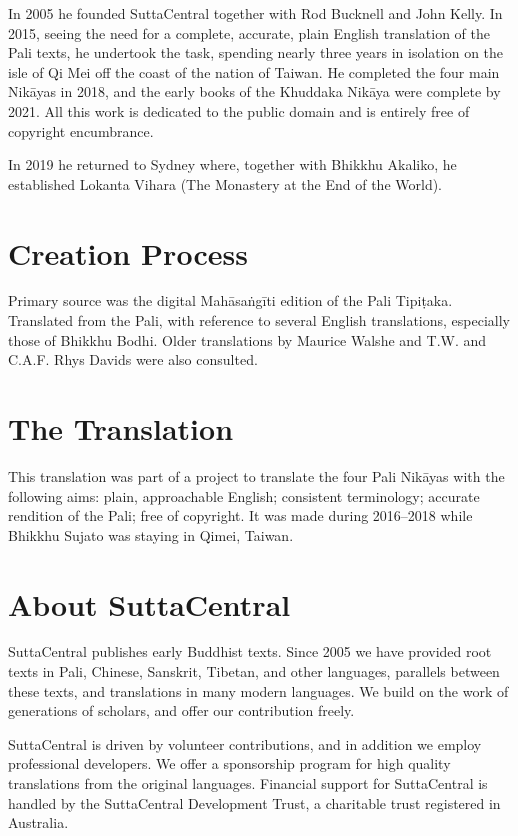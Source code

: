 \documentclass[12pt,openany]{book}%
\begin{document}
In 2005 he founded SuttaCentral together with Rod Bucknell and John Kelly. In 2015, seeing the need for a complete, accurate, plain English translation of the Pali texts, he undertook the task, spending nearly three years in isolation on the isle of Qi Mei off the coast of the nation of Taiwan. He completed the four main \textsanskrit{Nikāyas} in 2018, and the early books of the Khuddaka \textsanskrit{Nikāya} were complete by 2021. All this work is dedicated to the public domain and is entirely free of copyright encumbrance. 

In 2019 he returned to Sydney where, together with Bhikkhu Akaliko, he established Lokanta Vihara (The Monastery at the End of the World). 

\section*{Creation Process}

Primary source was the digital \textsanskrit{Mahāsaṅgīti} edition of the Pali \textsanskrit{Tipiṭaka}. Translated from the Pali, with reference to several English translations, especially those of Bhikkhu Bodhi. Older translations by Maurice Walshe and T.W. and C.A.F. Rhys Davids were also consulted.

\section*{The Translation}

This translation was part of a project to translate the four Pali \textsanskrit{Nikāyas} with the following aims: plain, approachable English; consistent terminology; accurate rendition of the Pali; free of copyright. It was made during 2016–2018 while Bhikkhu Sujato was staying in Qimei, Taiwan.

\section*{About SuttaCentral}

SuttaCentral publishes early Buddhist texts. Since 2005 we have provided root texts in Pali, Chinese, Sanskrit, Tibetan, and other languages, parallels between these texts, and translations in many modern languages. We build on the work of generations of scholars, and offer our contribution freely.

SuttaCentral is driven by volunteer contributions, and in addition we employ professional developers. We offer a sponsorship program for high quality translations from the original languages. Financial support for SuttaCentral is handled by the SuttaCentral Development Trust, a charitable trust registered in Australia.
\end{document}
